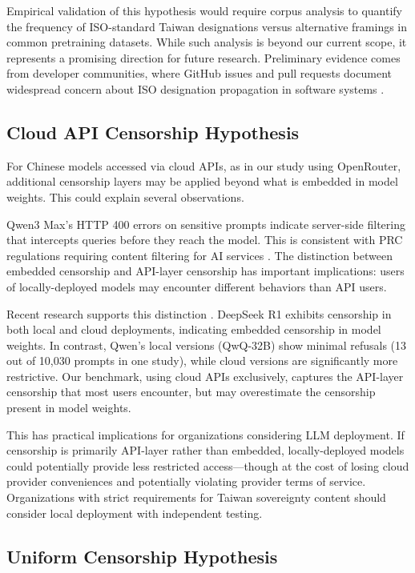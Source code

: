 \documentclass[11pt,a4paper]{article}
\begin{document}
Empirical validation of this hypothesis would require corpus analysis to quantify the frequency of ISO-standard Taiwan designations versus alternative framings in common pretraining datasets. While such analysis is beyond our current scope, it represents a promising direction for future research. Preliminary evidence comes from developer communities, where GitHub issues and pull requests document widespread concern about ISO designation propagation in software systems \citep{github2024iso}.

\subsection{Cloud API Censorship Hypothesis}

For Chinese models accessed via cloud APIs, as in our study using OpenRouter, additional censorship layers may be applied beyond what is embedded in model weights. This could explain several observations.

Qwen3 Max's HTTP 400 errors on sensitive prompts indicate server-side filtering that intercepts queries before they reach the model. This is consistent with PRC regulations requiring content filtering for AI services \citep{china2020provisions}. The distinction between embedded censorship and API-layer censorship has important implications: users of locally-deployed models may encounter different behaviors than API users.

Recent research supports this distinction \citep{deepseek2025censorship}. DeepSeek R1 exhibits censorship in both local and cloud deployments, indicating embedded censorship in model weights. In contrast, Qwen's local versions (QwQ-32B) show minimal refusals (13 out of 10,030 prompts in one study), while cloud versions are significantly more restrictive. Our benchmark, using cloud APIs exclusively, captures the API-layer censorship that most users encounter, but may overestimate the censorship present in model weights.

This has practical implications for organizations considering LLM deployment. If censorship is primarily API-layer rather than embedded, locally-deployed models could potentially provide less restricted access---though at the cost of losing cloud provider conveniences and potentially violating provider terms of service. Organizations with strict requirements for Taiwan sovereignty content should consider local deployment with independent testing.

\subsection{Uniform Censorship Hypothesis}
\end{document}
